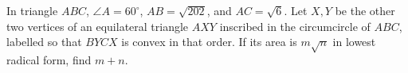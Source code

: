 In triangle $ABC$, $\angle A=60^\circ$, $AB=\sqrt{202}$, and $AC=\sqrt6$. Let $X,Y$ be the other two vertices of an equilateral triangle $AXY$ inscribed in the circumcircle of $ABC$, labelled so that $BYCX$ is convex in that order. If its area is $m\sqrt n$ in lowest radical form, find $m+n$.
